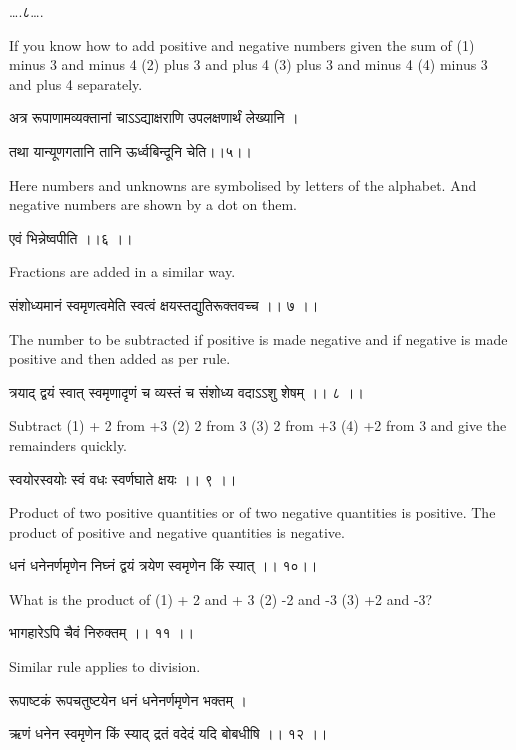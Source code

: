 \documentclass[]{article}
\date{}
\begin{document}
{\ldots{}.८\ldots{}.}

{If you know how to add positive and negative numbers given the sum of
(1) minus 3 and minus 4 (2) plus 3 and plus 4 (3) plus 3 and minus 4 (4)
minus 3 and plus 4 separately.}

{अत्र रूपाणामव्यक्तानां चाऽऽद्याक्षराणि उपलक्षणार्थं लेख्यानि । }

{तथा यान्यूणगतानि तानि ऊर्ध्वबिन्दूनि चेति।।५।। }

{Here numbers and unknowns are symbolised by letters of the alphabet.
And negative numbers are shown by a dot on them. }

{एवं भिन्नेष्वपीति ।।६ ।। }

{Fractions are added in a similar way.}

{संशोध्यमानं स्वमृणत्वमेति स्वत्वं क्षयस्तद्युतिरूक्तवच्च ।। ७ ।। }

{The number to be subtracted if positive is made negative and if
negative is made positive and then added as per rule.}

{त्रयाद् द्वयं स्वात् स्वमृणादृणं च व्यस्तं च संशोध्य वदाऽऽशु शेषम् ।। ८
।। }

{Subtract (1) + 2 from +3 (2) }{2 }{from }{3}{ (3) }{2 }{from +3 (4) +2
from}{ 3}{ and give the remainders quickly.}

{स्वयोरस्वयोः स्वं वधः स्वर्णघाते क्षयः ।। ९ ।। }

{Product of two positive quantities or of two negative quantities is
positive. The product of positive and negative quantities is negative.}

{धनं धनेनर्णमृणेन निघ्नं द्वयं त्रयेण स्वमृणेन किं स्या}{त्}{ ।। १०।। }

{What is the product of (1) + 2 and + 3 (2) -2 and -3 (3) +2 and -3?}

{भागहारेऽपि चैवं निरुक्तम् ।। ११ ।। }

{Similar rule applies to division.}

{रूपाष्टकं रूपचतुष्टयेन धनं धनेनर्णमृणेन भक्तम् । }

{ऋणं धनेन स्वमृणेन किं स्याद् द्रतं वदेदं यदि बोबधीषि ।। १२ ।।}{\\
}
\end{document}
